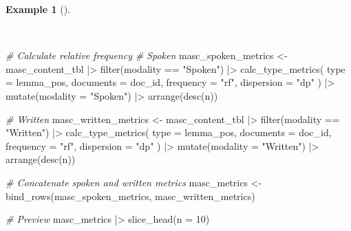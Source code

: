 \documentclass[
  letterpaper,
  DIV=11,
  numbers=noendperiod]{scrreport}
\newenvironment{Shaded}{\begin{snugshade}}{\end{snugshade}}
\newcommand{\AttributeTok}[1]{\textcolor[rgb]{0.00,0.00,0.00}{#1}}
\newcommand{\CommentTok}[1]{\textcolor[rgb]{0.00,0.00,0.00}{\textit{#1}}}
\newcommand{\DecValTok}[1]{\textcolor[rgb]{0.00,0.00,0.00}{#1}}
\newcommand{\FunctionTok}[1]{\textcolor[rgb]{0.00,0.00,0.00}{#1}}
\newcommand{\NormalTok}[1]{\textcolor[rgb]{0.00,0.00,0.00}{#1}}
\newcommand{\OtherTok}[1]{\textcolor[rgb]{0.00,0.00,0.00}{#1}}
\newcommand{\SpecialCharTok}[1]{\textcolor[rgb]{0.00,0.00,0.00}{#1}}
\newcommand{\StringTok}[1]{\textcolor[rgb]{0.00,0.00,0.00}{#1}}
\theoremstyle{definition}
\newtheorem{example}{Example}[chapter]
\theoremstyle{remark}
\begin{document}
\begin{example}[]\protect\hypertarget{exm-eda-masc-metrics-modality}{}\label{exm-eda-masc-metrics-modality}

~

\begin{Shaded}
\begin{Highlighting}[]
\CommentTok{\# Calculate relative frequency}
\CommentTok{\# Spoken}
\NormalTok{masc\_spoken\_metrics }\OtherTok{\textless{}{-}} 
\NormalTok{  masc\_content\_tbl }\SpecialCharTok{|\textgreater{}} 
  \FunctionTok{filter}\NormalTok{(modality }\SpecialCharTok{==} \StringTok{"Spoken"}\NormalTok{) }\SpecialCharTok{|\textgreater{}} 
  \FunctionTok{calc\_type\_metrics}\NormalTok{(}
    \AttributeTok{type =}\NormalTok{ lemma\_pos, }
    \AttributeTok{documents =}\NormalTok{ doc\_id, }
    \AttributeTok{frequency =} \StringTok{"rf"}\NormalTok{,}
    \AttributeTok{dispersion =} \StringTok{"dp"}
\NormalTok{  ) }\SpecialCharTok{|\textgreater{}} 
  \FunctionTok{mutate}\NormalTok{(}\AttributeTok{modality =} \StringTok{"Spoken"}\NormalTok{) }\SpecialCharTok{|\textgreater{}}
  \FunctionTok{arrange}\NormalTok{(}\FunctionTok{desc}\NormalTok{(n))}

\CommentTok{\# Written }
\NormalTok{masc\_written\_metrics }\OtherTok{\textless{}{-}} 
\NormalTok{  masc\_content\_tbl }\SpecialCharTok{|\textgreater{}} 
  \FunctionTok{filter}\NormalTok{(modality }\SpecialCharTok{==} \StringTok{"Written"}\NormalTok{) }\SpecialCharTok{|\textgreater{}} 
  \FunctionTok{calc\_type\_metrics}\NormalTok{(}
    \AttributeTok{type =}\NormalTok{ lemma\_pos, }
    \AttributeTok{documents =}\NormalTok{ doc\_id, }
    \AttributeTok{frequency =} \StringTok{"rf"}\NormalTok{,}
    \AttributeTok{dispersion =} \StringTok{"dp"}
\NormalTok{  ) }\SpecialCharTok{|\textgreater{}} 
  \FunctionTok{mutate}\NormalTok{(}\AttributeTok{modality =} \StringTok{"Written"}\NormalTok{) }\SpecialCharTok{|\textgreater{}} 
  \FunctionTok{arrange}\NormalTok{(}\FunctionTok{desc}\NormalTok{(n))}

\CommentTok{\# Concatenate spoken and written metrics}
\NormalTok{masc\_metrics }\OtherTok{\textless{}{-}}
  \FunctionTok{bind\_rows}\NormalTok{(masc\_spoken\_metrics, masc\_written\_metrics)}

\CommentTok{\# Preview}
\NormalTok{masc\_metrics }\SpecialCharTok{|\textgreater{}} 
  \FunctionTok{slice\_head}\NormalTok{(}\AttributeTok{n =} \DecValTok{10}\NormalTok{)}
\end{Highlighting}
\end{Shaded}


\end{example}
\end{document}
